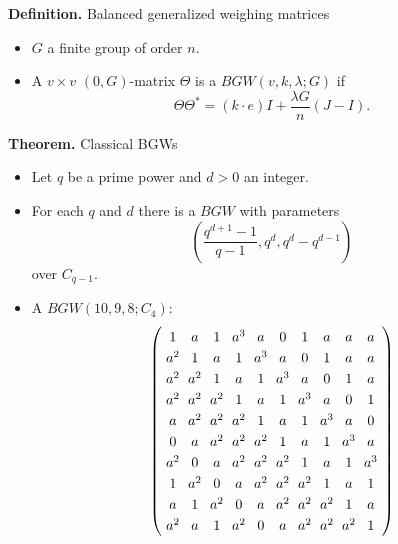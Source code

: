 \documentclass{beamer}
\begin{document}
\begin{frame}

  \begin{block}{{\bf Definition.} Balanced generalized weighing matrices}
    \begin{itemize}
    \item $G$ a finite group of order $n$.
    \item A $v \times v$ $(0,G)$-matrix $\Theta$ is a $BGW(v,k,\lambda; G)$ if
      \[
        \Theta\Theta^* = (k \cdot e)I + \frac{\lambda G}{n}(J-I).
      \]
    \end{itemize}
  \end{block}

  \begin{block}{{\bf Theorem.} Classical BGWs}
    \begin{itemize}
    \item Let $q$ be a prime power and $d>0$ an integer.
    \item For each $q$ and $d$ there is a $BGW$ with parameters
      \[
        \left(
          \frac{q^{d+1}-1}{q-1}, q^d, q^d-q^{d-1}
        \right)
      \]
      over $C_{q-1}$.
    \end{itemize}
  \end{block}

\end{frame}

\begin{frame}

  \begin{itemize}
  \item A $BGW(10,9,8; C_4)$:
    \[
      \left(
        \arraycolsep=3.0pt\def\arraystretch{1.25}
      \begin{array}{cccccccccc}
        1&a&1&a^3&a&0&1&a&a&a\\
        a^2&1&a&1&a^3&a&0&1&a&a\\
        a^2&a^2&1&a&1&a^3&a&0&1&a\\
        a^2&a^2&a^2&1&a&1&a^3&a&0&1\\
        a&a^2&a^2&a^2&1&a&1&a^3&a&0\\
        0&a&a^2&a^2&a^2&1&a&1&a^3&a\\
        a^2&0&a&a^2&a^2&a^2&1&a&1&a^3\\
        1&a^2&0&a&a^2&a^2&a^2&1&a&1\\
        a&1&a^2&0&a&a^2&a^2&a^2&1&a\\
        a^2&a&1&a^2&0&a&a^2&a^2&a^2&1\\
      \end{array}
      \right)
    \]
  \end{itemize}

\end{frame}
\end{document}
